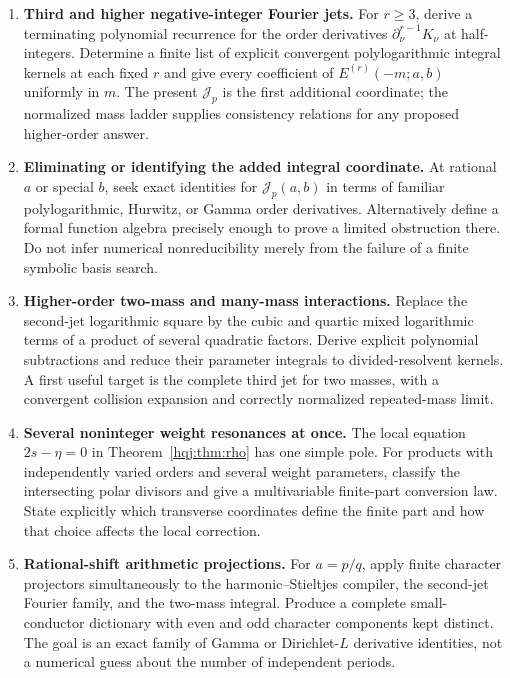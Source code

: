 \documentclass[11pt,letterpaper]{article}
\numberwithin{equation}{section}
\theoremstyle{definition}
\begin{document}
\begin{enumerate}
\item \textbf{Third and higher negative-integer Fourier jets.}
For $r\ge3$, derive a terminating polynomial recurrence for the
order derivatives $\partial_\nu^{r-1}K_\nu$ at half-integers.
Determine a finite list of explicit convergent polylogarithmic
integral kernels at each fixed $r$ and give every coefficient of
$E^{(r)}(-m;a,b)$ uniformly in $m$. The present $\mathcal J_p$ is the
first additional coordinate; the normalized mass ladder supplies
consistency relations for any proposed higher-order answer.

\item \textbf{Eliminating or identifying the added integral coordinate.}
At rational $a$ or special $b$, seek exact identities for
$\mathcal J_p(a,b)$ in terms of familiar polylogarithmic, Hurwitz,
or Gamma order derivatives. Alternatively define a formal function
algebra precisely enough to prove a limited obstruction there.
Do not infer numerical nonreducibility merely from the failure of a
finite symbolic basis search.

\item \textbf{Higher-order two-mass and many-mass interactions.}
Replace the second-jet logarithmic square by the cubic and quartic
mixed logarithmic terms of a product of several quadratic factors.
Derive explicit polynomial subtractions and reduce their parameter
integrals to divided-resolvent kernels. A first useful target is the
complete third jet for two masses, with a convergent collision
expansion and correctly normalized repeated-mass limit.

\item \textbf{Several noninteger weight resonances at once.}
The local equation $2s-\eta=0$ in Theorem~\ref{hqj:thm:rho} has one
simple pole. For products with independently varied orders and
several weight parameters, classify the intersecting polar divisors
and give a multivariable finite-part conversion law. State explicitly
which transverse coordinates define the finite part and how that
choice affects the local correction.

\item \textbf{Rational-shift arithmetic projections.}
For $a=p/q$, apply finite character projectors simultaneously to the
harmonic--Stieltjes compiler, the second-jet Fourier family, and the
two-mass integral. Produce a complete small-conductor dictionary
with even and odd character components kept distinct. The goal is
an exact family of Gamma or Dirichlet-$L$ derivative identities,
not a numerical guess about the number of independent periods.


\end{enumerate}
\end{document}
